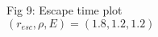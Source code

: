 \documentclass[preview]{standalone}
\begin{document}
\begin{center}
Fig 9: Escape time plot\\ $(r_{esc}, \rho, E)=(1.8, 1.2, 1.2)$
\end{center}
\end{document}
